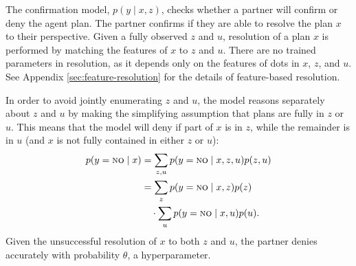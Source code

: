\documentclass[11pt]{article}
\newcommand{\justin}[1]{{{\textcolor{purple}{(Justin: #1)}}}}
\newcommand{\daniel}[1]{{{\textcolor{brown}{(Daniel: #1)}}}}
\begin{document}

The confirmation model, $p(y \mid x,z)$, checks whether a partner will confirm or deny the agent plan. The partner confirms if they are able to resolve the plan $x$ to their perspective. Given a fully observed $z$ and $u$, resolution of a plan $x$ is performed by matching the features of $x$ to $z$ and $u$.
There are no trained parameters in resolution, as it depends only on the features of dots in $x$, $z$, and $u$.
See Appendix \ref{sec:feature-resolution} for the details of feature-based resolution.

In order to avoid jointly enumerating $z$ and $u$, the model reasons separately about $z$ and $u$ by making the simplifying assumption that plans are fully in $z$ or $u$.
This means that the model will deny if part of $x$ is in $z$, while the remainder is in $u$ (and $x$ is not fully contained in either $z$ or $u$):
\begin{align*}
p(y=\textsc{no}\mid x) &=\sum_{z,u} p(y=\textsc{no} \mid x, z, u)p(z,u)\\
&=\sum_z p(y=\textsc{no}\mid x, z )p(z)\\
&\quad \cdot \sum_u p(y=\textsc{no}\mid  x, u )p(u).
\end{align*}
Given the unsuccessful resolution of $x$ to both $z$ and $u$, the partner denies accurately with probability $\theta$, a hyperparameter.

\end{document}
